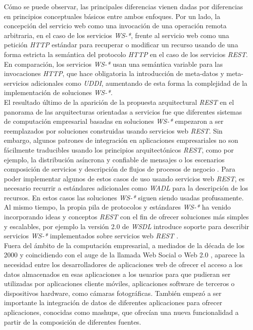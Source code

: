 C\'omo se puede observar, las principales diferencias vienen dadas por diferencias en principios conceptuales b\'asicos entre ambos enfoques. Por un lado, la concepci\'on del servicio web como una invocaci\'on de una operaci\'on remota arbitraria, en el caso de los servicios \textit{WS-*}, frente al servicio web como una petici\'on \textit{HTTP} est\'andar para recuperar o modificar un recurso usando de una forma estricta la sem\'antica del protocolo \textit{HTTP} en el caso de los servicios \textit{REST}. En comparaci\'on, los servicios \textit{WS-*} usan una sem\'antica variable para las invocaciones \textit{HTTP}, que hace obligatoria la introducci\'on de meta-datos y meta-servicios adicionales como \textit{UDDI}, aumentando de esta forma la complejidad de la implementaci\'on de soluciones \textit{WS-*}.\\
El resultado \'ultimo de la aparici\'on de la propuesta arquitectural \textit{REST} en el panorama de las arquitecturas orientadas a servicios fue que diferentes sistemas de computaci\'on empresarial basadas en soluciones \textit{WS-*} empezaron a ser reemplazados por soluciones construidas usando servicios web \textit{REST}. Sin embargo, algunos patrones de integraci\'on en aplicaciones empresariales no son f\'acilmente traducibles usando los principios arquitect\'onicos \textit{REST}, como por ejemplo, la distribuci\'on as\'incrona y confiable de mensajes o los escenarios composici\'on de servicios y descripci\'on de flujos de procesos de negocio \cite{pautasso2008restful}. Para poder implementar algunos de estos casos de uso usando servicios web \textit{REST}, es necesario recurrir a est\'andares adicionales como \textit{WADL} \cite{wadl} para la descripci\'on de los recursos. En estos casos las soluciones \textit{WS-*} siguen siendo usadas profusamente.\\
Al mismo tiempo, la propia pila de protocolos y est\'andares \textit{WS-*} ha venido incorporando ideas y conceptos \textit{REST} con el fin de ofrecer soluciones m\'as simples y escalables, por ejemplo la versi\'on 2.0 de \textit{WSDL} introduce soporte para describir servicios \textit{WS-*} implementados sobre servicios web \textit{REST} \cite{takase2008definition}.\\
Fuera del \'ambito de la computaci\'on empresarial, a mediados de la d\'ecada de los 2000 y coincidiendo con el auge de la llamada Web Social o Web 2.0 \cite{murugesan2007understanding}, aparece la necesidad entre los desarrolladores de aplicaciones web de ofrecer el acceso a los datos almacenados en esas aplicaciones a los usuarios para que pudieran ser utilizadas por aplicaciones cliente m\'oviles, aplicaciones software de terceros o dispositivos hardware, como c\'amaras fotogr\'aficas. Tambi\'en empez\'o a ser importante la integraci\'on de datos de diferentes aplicaciones para ofrecer aplicaciones, conocidas como mashups, que ofrec\'ian una nueva funcionalidad a partir de la composici\'on de diferentes fuentes.\\
